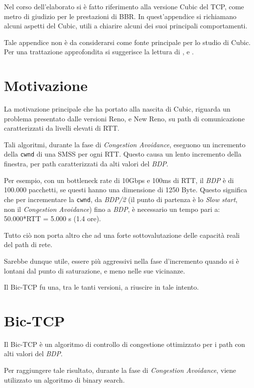Nel corso dell'elaborato si è fatto riferimento alla versione Cubic del TCP, come metro di giudizio per le prestazioni di BBR. In quest'appendice si richiamano alcuni aspetti del Cubic, utili a chiarire alcuni dei suoi principali comportamenti. \bigskip

Tale appendice non è da considerarsi come fonte principale per lo studio di Cubic. Per una trattazione approfondita si suggerisce la lettura di \cite{ietf:draft-ietf-tcpm-cubic-05}, e \cite{Ha:2008:CNT:1400097.1400105}.

\section{Motivazione}

La motivazione principale che ha portato alla nascita di Cubic, riguarda un problema presentato dalle versioni Reno, e New Reno, su path di comunicazione caratterizzati da livelli elevati di RTT. \bigskip

Tali algoritmi, durante la fase di \textit{Congestion Avoidance}, eseguono un incremento della \texttt{cwnd} di una SMSS per ogni RTT. Questo causa un lento incremento della finestra, per path caratterizzati da alti valori del \textit{BDP}. \bigskip

Per esempio, con un bottleneck rate di 10Gbps e 100ms di RTT, il \textit{BDP} è di 100.000 pacchetti, se questi hanno una dimensione di 1250 Byte. Questo significa che per incrementare la \texttt{cwnd}, da \textit{BDP/2} (il punto di partenza è lo \textit{Slow start}, non il \textit{Congestion Avoidance}) fino a \textit{BDP}, è necessario un tempo pari a: 50.000*RTT = 5.000 s (1.4 ore). \bigskip

Tutto ciò non porta altro che ad una forte sottovalutazione delle capacità reali del path di rete. \bigskip

Sarebbe dunque utile, essere più aggressivi nella fase d'incremento quando si è lontani dal punto di saturazione, e meno nelle sue vicinanze. \bigskip

Il Bic-TCP fu una, tra le tanti versioni, a riuscire in tale intento.

\section{Bic-TCP}

Il Bic-TCP è un algoritmo di controllo di congestione ottimizzato per i path con alti valori del \textit{BDP}. \bigskip

Per raggiungere tale risultato, durante la fase di \textit{Congestion Avoidance}, viene utilizzato un algoritmo di binary search. \bigskip

